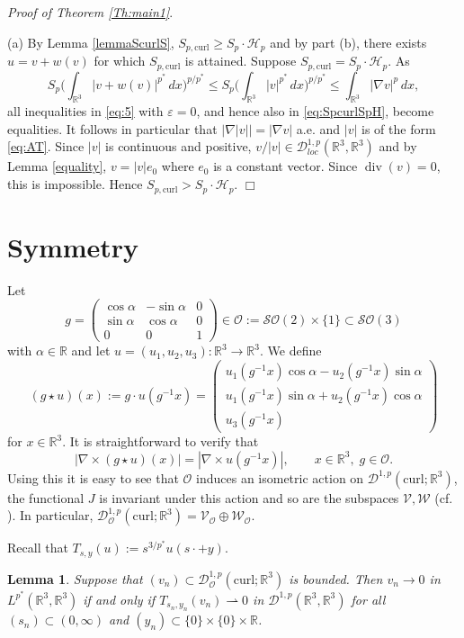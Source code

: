 \documentclass[12pt,leqno,twoside]{amsart}
\newtheorem{Lem}[Th]{Lemma}
\newenvironment{altproof}[1]
{\noindent%
{\em Proof of {#1}}.}
{\nopagebreak\mbox{}\hfill $\Box$\par\addvspace{0.5cm}}
\newcommand{\eps}{\varepsilon}
\def\div{\mathop{\mathrm{div}}}
\def\R{\mathbb{R}}
\def\curl{\mathrm{curl}}
\def\Wc{\mathscr{W}}
\newcommand{\SO}{\cS\cO}
\newcommand{\cD}{{\mathcal D}}
\newcommand{\cDp}{\cD^{1,p}(\R^3,\R^3)}
\newcommand{\cH}{{\mathcal H}}
\newcommand{\cO}{{\mathcal O}}
\newcommand{\cS}{{\mathcal S}}
\newcommand{\cV}{{\mathcal V}}
\newcommand{\cW}{{\mathcal W}}
\def\r{\mathbb{R}}
\def\r3{\mathbb{R}^3}
\def\Wc{\cD^{1,p}(\curl;\R^3)}
\def\Wco{\cD^{1,p}_{\cO}(\curl;\R^3)}
\def\eps{\varepsilon}
\def\ir3{\int_{\r3}}
\def\curlop{\nabla\times}
\newcommand{\weakto}{\rightharpoonup}
\numberwithin{equation}{section}
\begin{document}
\begin{altproof}{Theorem \ref{Th:main1}}
\medskip

(a) By Lemma \ref{lemmaScurlS}, $S_{p,\curl} \ge S_p\cdot \cH_p$ and by part (b), there exists $u=v+w(v)$ for which $S_{p,\curl}$ is attained. Suppose $S_{p,\curl}=S_p\cdot \cH_p$. As
\[
S_p\Big(\ir3|v+w(v)|^{p^*}\,dx\Big)^{p/p^*} \le S_p\Big(\ir3|v|^{p^*}\,dx\Big)^{p/p^*} \le \ir3|\nabla v|^p\,dx,
\]
 all inequalities  in \eqref{eq:5} with $\eps=0$, and hence also in \eqref{eq:SpcurlSpH}, become equalities. It follows in particular that $\left|\nabla|v|\right| = |\nabla v|$ a.e. and $|v|$ is of the form \eqref{eq:AT}. Since $|v|$ is continuous and positive, $v/|v|\in \cD^{1,p}_{loc}(\r3,\r3)$ and by Lemma \ref{equality}, $v=|v|e_0$ where $e_0$ is a constant vector. Since $\div(v)=0$, this is impossible. Hence $S_{p,\curl}>S_p\cdot \cH_p$.
\end{altproof}






\section{Symmetry}\label{sec:symmetry}


Let 
$$
g=\begin{pmatrix} \cos \alpha & -\sin  \alpha & 0\\
\sin  \alpha &  \cos \alpha & 0\\
0& 0 & 1
\end{pmatrix} \in\cO:=\SO(2)\times\{1\}\subset \SO(3)
$$ 
with $\alpha \in\R$ and let $u=(u_1,u_2,u_3):\R^3\to\R^3$. We define 
$$(g\star u)(x) := g\cdot u(g^{-1} x)
=\begin{pmatrix}  u_1 (g^{-1}x) \cos\alpha - u_2 (g^{-1}x) \sin\alpha\\
u_1 (g^{-1}x) \sin\alpha + u_2 (g^{-1}x) \cos\alpha\\
u_3 (g^{-1}x)\end{pmatrix}$$ 
for $x\in\R^3$.
It is straightforward to verify that
\[
|\curlop (g\star u)(x)| = |\curlop u (g^{-1}x)|, 
\qquad x \in \mathbb{R}^3,\; g \in \mathcal{O}.
\]
Using this it is easy to see that $\cO$ induces an isometric action on $\Wc$, the functional $J$ is invariant under this action and so are the subspaces $\cV,\cW$ (cf. \cite[Proposition 6.1]{BartschMederski2}). In particular, $\Wco = \cV_\cO \oplus \cW_\cO$.

Recall that $T_{s,y}(u):= s^{3/p^*}u(s\cdot +y)$.

\begin{Lem}\label{lem:Solimini2}
Suppose that $(v_n)\subset \Wco$ is bounded. Then $v_n\to 0$ in $L^{p^*}(\R^3,\R^3)$ if and only if $T_{s_n,y_n}(v_n)\weakto 0$ in $\cDp$ for all $(s_n)\subset (0,\infty)$ and $(y_n)\subset \{0\}\times\{0\}\times\R$.
\end{Lem}
\end{document}
